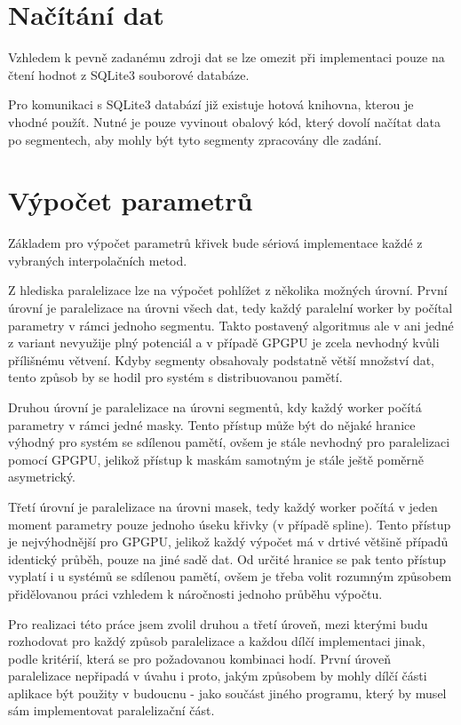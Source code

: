 \documentclass[]{thesiskiv}
\begin{document}
\section{Načítání dat}

Vzhledem k pevně zadanému zdroji dat se lze omezit při implementaci pouze na čtení hodnot z SQLite3 souborové databáze.

Pro komunikaci s SQLite3 databází již existuje hotová knihovna, kterou je vhodné použít. Nutné je pouze vyvinout obalový kód, který dovolí načítat data po segmentech, aby mohly být tyto segmenty zpracovány dle zadání.

\section{Výpočet parametrů}

Základem pro výpočet parametrů křivek bude sériová implementace každé z vybraných interpolačních metod.

Z hlediska paralelizace lze na výpočet pohlížet z několika možných úrovní. První úrovní je paralelizace na úrovni všech dat, tedy každý paralelní worker by počítal parametry v rámci jednoho segmentu. Takto postavený algoritmus ale v ani jedné z variant nevyužije plný potenciál a v případě GPGPU je zcela nevhodný kvůli přílišnému větvení. Kdyby segmenty obsahovaly podstatně větší množství dat, tento způsob by se hodil pro systém s distribuovanou pamětí.

Druhou úrovní je paralelizace na úrovni segmentů, kdy každý worker počítá parametry v rámci jedné masky. Tento přístup může být do nějaké hranice výhodný pro systém se sdílenou pamětí, ovšem je stále nevhodný pro paralelizaci pomocí GPGPU, jelikož přístup k maskám samotným je stále ještě poměrně asymetrický.

Třetí úrovní je paralelizace na úrovni masek, tedy každý worker počítá v jeden moment parametry pouze jednoho úseku křivky (v případě spline). Tento přístup je nejvýhodnější pro GPGPU, jelikož každý výpočet má v drtivé většině případů identický průběh, pouze na jiné sadě dat. Od určité hranice se pak tento přístup vyplatí i u systémů se sdílenou pamětí, ovšem je třeba volit rozumným způsobem přidělovanou práci vzhledem k náročnosti jednoho průběhu výpočtu.

Pro realizaci této práce jsem zvolil druhou a třetí úroveň, mezi kterými budu rozhodovat pro každý způsob paralelizace a každou dílčí implementaci jinak, podle kritérií, která se pro požadovanou kombinaci hodí. První úroveň paralelizace nepřipadá v úvahu i proto, jakým způsobem by mohly dílčí části aplikace být použity v budoucnu - jako součást jiného programu, který by musel sám implementovat paralelizační část.
\end{document}
